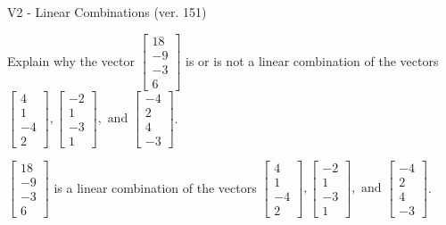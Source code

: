 \begin{exercise}
  \begin{exerciseTitle}V2 - Linear Combinations (ver. 151)\end{exerciseTitle}
  \begin{exerciseStatement}
    Explain why the vector \(\left[\begin{array}{c}
18 \\
-9 \\
-3 \\
6
\end{array}\right]\)  is or is not a linear 
	combination of the vectors \(\left[\begin{array}{c}
4 \\
1 \\
-4 \\
2
\end{array}\right] , \left[\begin{array}{c}
-2 \\
1 \\
-3 \\
1
\end{array}\right] , \text{ and } \left[\begin{array}{c}
-4 \\
2 \\
4 \\
-3
\end{array}\right]\).
	


  \end{exerciseStatement}
  \begin{exerciseAnswer}
   \(\left[\begin{array}{c}
18 \\
-9 \\
-3 \\
6
\end{array}\right]\) 
  	 is  
	a linear combination of the vectors \(\left[\begin{array}{c}
4 \\
1 \\
-4 \\
2
\end{array}\right] , \left[\begin{array}{c}
-2 \\
1 \\
-3 \\
1
\end{array}\right] , \text{ and } \left[\begin{array}{c}
-4 \\
2 \\
4 \\
-3
\end{array}\right]\).

	
  


  \end{exerciseAnswer}
\end{exercise}